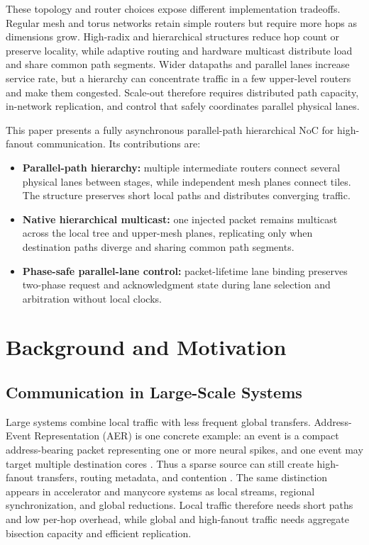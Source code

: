\documentclass[conference]{IEEEtran}
\begin{document}
These topology and router choices expose different implementation tradeoffs.
Regular mesh and torus networks retain simple routers but require more hops as dimensions
grow. High-radix and hierarchical structures reduce hop count or preserve
locality, while adaptive routing and hardware multicast distribute load and
share common path segments. Wider datapaths and parallel lanes increase
service rate, but a hierarchy can concentrate traffic in a few upper-level
routers and make them congested. Scale-out therefore requires distributed path
capacity, in-network replication, and control that safely coordinates parallel
physical lanes.

This paper presents a fully asynchronous parallel-path hierarchical NoC
for high-fanout communication. Its contributions are:

\begin{itemize}
\item \textbf{Parallel-path hierarchy:} multiple intermediate routers
connect several physical lanes between stages, while independent mesh
planes connect tiles. The structure preserves short local paths and
distributes converging traffic.
\item \textbf{Native hierarchical multicast:} one injected packet
remains multicast across the local tree and upper-mesh planes, replicating only
when destination paths diverge and sharing common path segments.
\item \textbf{Phase-safe parallel-lane control:} packet-lifetime lane
binding preserves two-phase request and acknowledgment state during lane
selection and arbitration without local clocks.
\end{itemize}

\section{Background and Motivation}\label{sec:background}

\subsection{Communication in Large-Scale Systems}\label{sec:large-scale-communication}

Large systems combine local traffic with less frequent global transfers.
Address-Event Representation (AER) is one concrete example: an event is a
compact address-bearing packet representing one or more neural spikes, and
one event may target multiple destination cores
\cite{moradi2018dynaps,merolla2014tree}. Thus a sparse source can still create
high-fanout transfers, routing metadata, and contention
\cite{su2025hbs}. The same distinction appears in accelerator and manycore
systems as local streams, regional synchronization, and global reductions.
Local traffic therefore needs short paths and low per-hop overhead, while
global and high-fanout traffic needs aggregate bisection capacity and
efficient replication.
\end{document}
